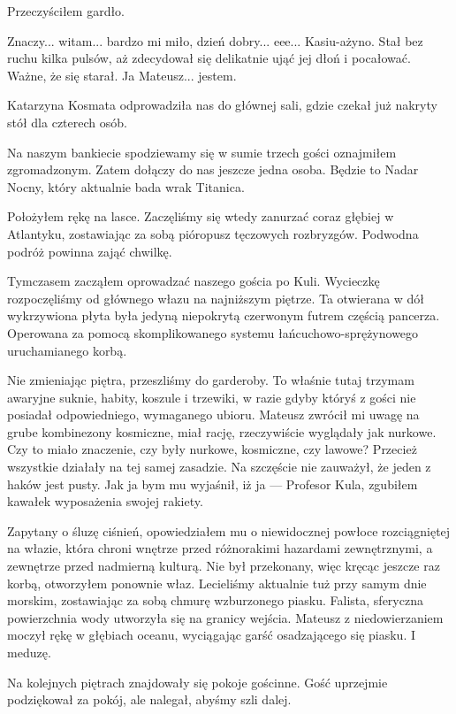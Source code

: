 Przeczyściłem gardło.

\ds{} Znaczy... witam... bardzo mi miło, dzień dobry... eee... Kasiu-ażyno. \dm{} Stał bez ruchu kilka pulsów, aż zdecydował się delikatnie ująć jej dłoń i pocałować.
Ważne, że się starał. \dm{} Ja Mateusz... jestem. \de{}

Katarzyna Kosmata odprowadziła nas do głównej sali, gdzie czekał już nakryty stół dla czterech osób.

\ds{} Na naszym bankiecie spodziewamy się w sumie trzech gości \dm{} oznajmiłem zgromadzonym. \dm{} Zatem dołączy do nas jeszcze jedna osoba.
Będzie to Nadar Nocny, który aktualnie bada wrak Titanica.   \de{}

Położyłem rękę na lasce.
Zaczęliśmy się wtedy zanurzać coraz głębiej w Atlantyku, zostawiając za sobą pióropusz tęczowych rozbryzgów. Podwodna podróż powinna zająć chwilkę.

Tymczasem zacząłem oprowadzać naszego gościa po Kuli.
Wycieczkę rozpoczęliśmy od głównego włazu na najniższym piętrze.
Ta otwierana w dół wykrzywiona płyta była jedyną niepokrytą czerwonym futrem częścią pancerza.
Operowana za pomocą skomplikowanego systemu łańcuchowo-sprężynowego uruchamianego korbą.

Nie zmieniając piętra, przeszliśmy do garderoby.
To właśnie tutaj trzymam awaryjne suknie, habity, koszule i trzewiki, w razie gdyby któryś z gości nie posiadał odpowiedniego, wymaganego ubioru.
Mateusz zwrócił mi uwagę na grube kombinezony kosmiczne, miał rację, rzeczywiście wyglądały jak nurkowe.
Czy to miało znaczenie, czy były nurkowe, kosmiczne, czy lawowe? Przecież wszystkie działały na tej samej zasadzie.
Na szczęście nie zauważył, że jeden z haków jest pusty. Jak ja bym mu wyjaśnił, iż ja --- Profesor Kula, zgubiłem kawałek wyposażenia swojej rakiety.

Zapytany o śluzę ciśnień, opowiedziałem mu o niewidocznej powłoce rozciągniętej na włazie, która chroni wnętrze przed różnorakimi hazardami zewnętrznymi,
a zewnętrze przed nadmierną kulturą.
Nie był przekonany, więc kręcąc jeszcze raz korbą, otworzyłem ponownie właz. Lecieliśmy aktualnie tuż przy samym dnie morskim, zostawiając za sobą chmurę wzburzonego piasku.
Falista, sferyczna powierzchnia wody utworzyła się na granicy wejścia. Mateusz z niedowierzaniem moczył rękę w głębiach oceanu, wyciągając garść osadzającego się piasku.
I meduzę.

Na kolejnych piętrach znajdowały się pokoje gościnne. Gość uprzejmie podziękował za pokój, ale nalegał, abyśmy szli dalej.

